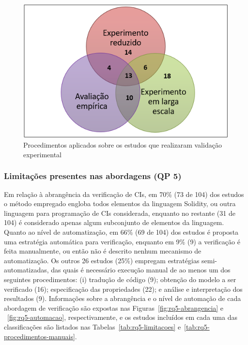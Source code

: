 \begin{figure}[!htb]
 \caption{Procedimentos aplicados sobre os estudos que realizaram validação experimental}
 \label{fig:rq4-diagrama-experimento}
 \centering
 \includegraphics[scale=0.7]{figuras/rq4-diagrama-experimento.png}
 \fdadospesquisa
\end{figure}


\subsubsection*{Limitações presentes nas abordagens (\textbf{QP 5})}


Em relação à abrangência da verificação de CIs, em 70\% (73 de 104) dos estudos o método empregado engloba todos elementos da linguagem Solidity, ou outra linguagem para programação de CIs considerada, enquanto no restante (31 de 104) é considerado apenas algum subconjunto de elementos da linguagem. Quanto ao nível de automatização, em 66\% (69 de 104) dos estudos é proposta uma estratégia automática para verificação, enquanto em 9\% (9) a verificação é feita manualmente, ou então não é descrito nenhum mecanismo de automatização. Os outros 26 estudos (25\%) empregam estratégias semi-automatizadas, das quais é necessário execução manual de ao menos um dos seguintes procedimentos: (i) tradução de código (9); obtenção do modelo a ser verificado (16); especificação das propriedades (22); e análise e interpretação dos resultados (9). Informações sobre a abrangência e o nível de automação de cada abordagem de verificação são expostas nas Figuras~\ref{fig:rq5-abrangencia} e ~\ref{fig:rq5-automacao}, respectivamente, e os estudos incluídos em cada uma das classificações são listados nas Tabelas~\ref{tab:rq5-limitacoes} e~\ref{tab:rq5-procedimentos-manuais}. 

